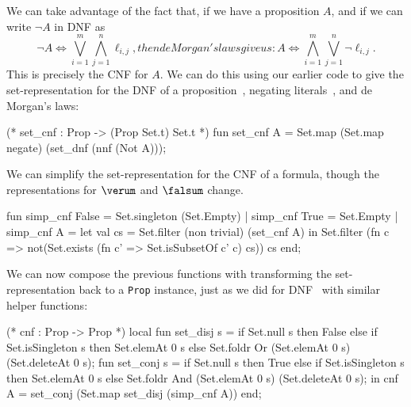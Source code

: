 \begin{node}
\begin{definition}
\begin{node}\label{prop:normal-form-000E}%
\begin{node}\label{prop:normal-form-000H}%
We can take advantage of the fact that, if we have a proposition $A$,
and if we can write $\neg A$ in DNF as
\begin{subequations}
\begin{equation}
\neg A\iff\bigvee^{m}_{i=1}\bigwedge^{n}_{j=1}\ell_{i,j},
\end{equation}
then de Morgan's laws give us:
\begin{equation}
A \iff\bigwedge^{m}_{i=1}\bigvee^{n}_{j=1}\neg\ell_{i,j}.
\end{equation}
\end{subequations}
This is precisely the CNF for $A$. We can do this using our earlier code
to give the set-representation for the DNF of a proposition~,
negating literals~, and de Morgan's laws:
\begin{sml}
(* set_cnf : Prop -> (Prop Set.t) Set.t *)
fun set_cnf A = Set.map (Set.map negate) (set_dnf (nnf (Not A)));
\end{sml}
\end{node}

\begin{node}[Simplification]\label{prop:normal-form-000I}%
We can simplify the set-representation for the CNF of a formula, though
the representations for $\verum$ and $\falsum$ change.
\begin{sml}
fun simp_cnf False = Set.singleton (Set.Empty)
 |  simp_cnf True = Set.Empty
 |  simp_cnf A = let val cs = Set.filter (non trivial) (set_cnf A)
                 in Set.filter (fn c =>
                                  not(Set.exists (fn c' => Set.isSubsetOf c' c)
                                                 cs))
                               cs
                 end;
\end{sml}
\end{node}

\begin{node}\label{prop:normal-form-000J}%
We can now compose the previous functions with transforming the
set-representation back to a \lstinline[basicstyle=\color{sbase03}\ttfamily\small,language=SML]{Prop}
instance, just as we did for DNF~ with
similar helper functions:
\begin{sml}
(* cnf : Prop -> Prop *)
local
  fun set_disj s = if Set.null s
                   then False
                   else if Set.isSingleton s
                   then Set.elemAt 0 s
                   else Set.foldr Or (Set.elemAt 0 s) (Set.deleteAt 0 s);
  fun set_conj s = if Set.null s
                   then True
                   else if Set.isSingleton s
                   then Set.elemAt 0 s
                   else Set.foldr And (Set.elemAt 0 s) (Set.deleteAt 0 s);
in
  cnf A = set_conj (Set.map set_disj (simp_cnf A))
end;
\end{sml}
\end{node}


\end{node}
\end{definition}
\end{node}
